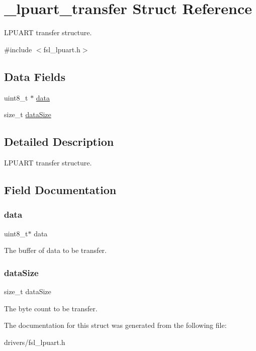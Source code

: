\hypertarget{struct__lpuart__transfer}{}\section{\+\_\+lpuart\+\_\+transfer Struct Reference}
\label{struct__lpuart__transfer}


L\+P\+U\+A\+RT transfer structure.  




{\ttfamily \#include $<$fsl\+\_\+lpuart.\+h$>$}

\subsection*{Data Fields}
\begin{DoxyCompactItemize}
\item 
uint8\+\_\+t $\ast$ \mbox{\hyperlink{struct__lpuart__transfer_abe222f6d3581e7920dcad5306cc906a8}{data}}
\item 
size\+\_\+t \mbox{\hyperlink{struct__lpuart__transfer_a78f9703861dd365a513c2c5aab9f9239}{data\+Size}}
\end{DoxyCompactItemize}


\subsection{Detailed Description}
L\+P\+U\+A\+RT transfer structure. 

\subsection{Field Documentation}
\mbox{\label{struct__lpuart__transfer_abe222f6d3581e7920dcad5306cc906a8}} 
\subsubsection{\texorpdfstring{data}{data}}
{\footnotesize\ttfamily uint8\+\_\+t$\ast$ data}

The buffer of data to be transfer. \mbox{\label{struct__lpuart__transfer_a78f9703861dd365a513c2c5aab9f9239}} 
\subsubsection{\texorpdfstring{dataSize}{dataSize}}
{\footnotesize\ttfamily size\+\_\+t data\+Size}

The byte count to be transfer. 

The documentation for this struct was generated from the following file\+:\begin{DoxyCompactItemize}
\item 
drivers/fsl\+\_\+lpuart.\+h\end{DoxyCompactItemize}
